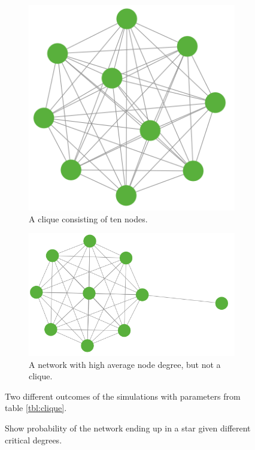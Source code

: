 \begin{figure}[h]
\centering
\begin{subfigure}{.5\textwidth}
  \centering
  \includegraphics[width=0.4\linewidth]{../Figures/discount/cliquetennodes.png}
  \caption{\label{fig:discountclique} A clique consisting of ten nodes. }
\end{subfigure}
\quad
\begin{subfigure}{.46\textwidth}
  \centering
  \includegraphics[width=0.8\linewidth]{../Figures/discount/baloontennodes.png}
  \caption{\label{fig:discountbaloon} A network with high average node degree, but not a clique.}
\end{subfigure}
\caption{\label{fig:discounthighdegree} Two different outcomes of the simulations with parameters from table \ref{tbl:clique}.}
\end{figure}


\begin{figure}
\caption{\label{fig:PlotStar} Show probability of the network ending up in a star given different critical degrees.}
\end{figure}

